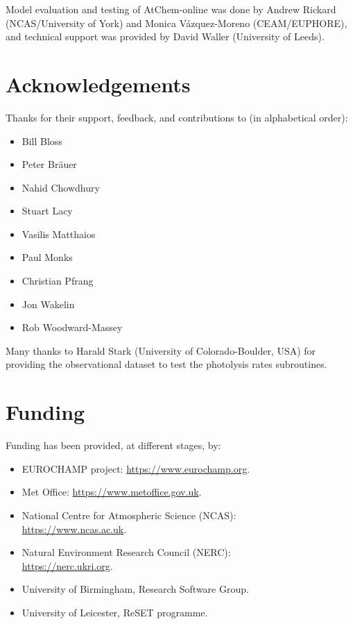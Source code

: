 Model evaluation and testing of AtChem-online was done by Andrew
Rickard (NCAS/University of York) and Monica V{\'a}zquez-Moreno
(CEAM/EUPHORE), and technical support was provided by David Waller
(University of Leeds).

\section{Acknowledgements} \label{sec:acknowledgements}

Thanks for their support, feedback, and contributions to (in
alphabetical order):

\begin{itemize}
\item Bill Bloss
\item Peter Br{\"a}uer
\item Nahid Chowdhury
\item Stuart Lacy
\item Vasilis Matthaios
\item Paul Monks
\item Christian Pfrang
\item Jon Wakelin
\item Rob Woodward-Massey
\end{itemize}

Many thanks to Harald Stark (University of Colorado-Boulder, USA) for
providing the observational dataset to test the photolysis rates
subroutines.

\section{Funding} \label{sec:funding}

Funding has been provided, at different stages, by:

\begin{itemize}
\item EUROCHAMP project: \url{https://www.eurochamp.org}.
\item Met Office: \url{https://www.metoffice.gov.uk}.
\item National Centre for Atmospheric Science (NCAS):\\ \url{https://www.ncas.ac.uk}.
\item Natural Environment Research Council (NERC):\\ \url{https://nerc.ukri.org}.
\item University of Birmingham, Research Software Group.
\item University of Leicester, ReSET programme.
\end{itemize}
